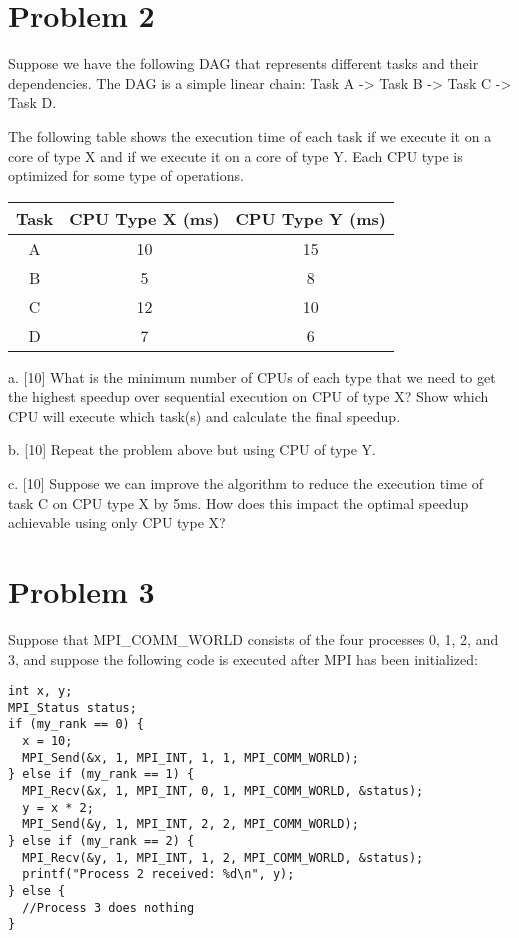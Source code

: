 \documentclass{article}
\begin{document}
\section*{Problem 2}

Suppose we have the following DAG that represents different tasks and their dependencies. The DAG is a simple linear chain: Task A -> Task B -> Task C -> Task D.

The following table shows the execution time of each task if we execute it on a core of type X and if we execute it on a core of type Y.  Each CPU type is optimized for some type of operations.

\begin{tabular}{|c|c|c|}
\hline
Task & CPU Type X (ms) & CPU Type Y (ms) \\
\hline
A & 10 & 15 \\
B & 5 & 8 \\
C & 12 & 10 \\
D & 7 & 6 \\
\hline
\end{tabular}

a. [10] What is the minimum number of CPUs of each type that we need to get the highest speedup over sequential execution on CPU of type X? Show which CPU will execute which task(s) and calculate the final speedup.

b. [10] Repeat the problem above but using CPU of type Y.

c. [10]  Suppose we can improve the algorithm to reduce the execution time of task C on CPU type X by 5ms. How does this impact the optimal speedup achievable using only CPU type X?


\section*{Problem 3}

Suppose that MPI\_COMM\_WORLD consists of the four processes 0, 1, 2, and 3, and suppose the following code is executed after MPI has been initialized:

\begin{verbatim}
int x, y;
MPI_Status status;
if (my_rank == 0) {
  x = 10;
  MPI_Send(&x, 1, MPI_INT, 1, 1, MPI_COMM_WORLD);
} else if (my_rank == 1) {
  MPI_Recv(&x, 1, MPI_INT, 0, 1, MPI_COMM_WORLD, &status);
  y = x * 2;
  MPI_Send(&y, 1, MPI_INT, 2, 2, MPI_COMM_WORLD);
} else if (my_rank == 2) {
  MPI_Recv(&y, 1, MPI_INT, 1, 2, MPI_COMM_WORLD, &status);
  printf("Process 2 received: %d\n", y);
} else {
  //Process 3 does nothing
}
\end{verbatim}
\end{document}
